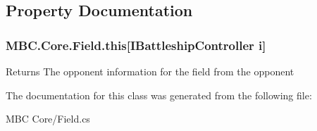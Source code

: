 \subsection{Property Documentation}
\hypertarget{class_m_b_c_1_1_core_1_1_field_a68bea4ce761a6ddca725e952213a9949}{
\subsubsection[{this[I\-Battleship\-Controller i]}]{ M\-B\-C.\-Core.\-Field.\-this\mbox{[}{\bf I\-Battleship\-Controller} i\mbox{]}\hspace{0.3cm}{\ttfamily [get]}}}\label{class_m_b_c_1_1_core_1_1_field_a68bea4ce761a6ddca725e952213a9949}
\begin{DoxyReturn}{Returns}
The opponent information for the field from the opponent
\end{DoxyReturn}


The documentation for this class was generated from the following file\-:\begin{DoxyCompactItemize}
\item 
M\-B\-C Core/Field.\-cs\end{DoxyCompactItemize}
